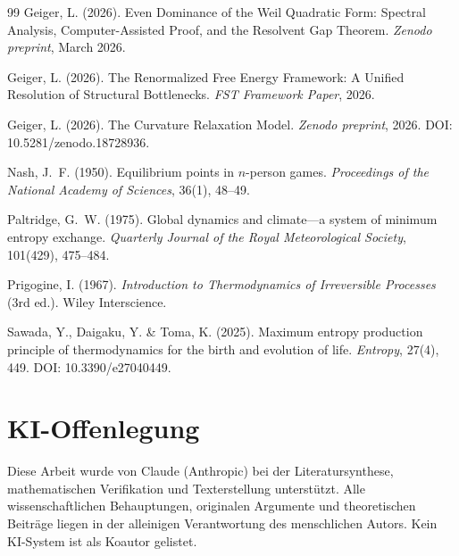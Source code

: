 \documentclass[12pt,a4paper]{article}
\theoremstyle{remark}
\begin{document}
\begin{thebibliography}{99}
Geiger, L. (2026).
\newblock Even Dominance of the Weil Quadratic Form: Spectral Analysis, Computer-Assisted Proof, and the Resolvent Gap Theorem.
\newblock \textit{Zenodo preprint}, March 2026.

Geiger, L. (2026).
\newblock The Renormalized Free Energy Framework: A Unified Resolution of Structural Bottlenecks.
\newblock \textit{FST Framework Paper}, 2026.

Geiger, L. (2026).
\newblock The Curvature Relaxation Model.
\newblock \textit{Zenodo preprint}, 2026.
\newblock DOI: 10.5281/zenodo.18728936.

Nash, J.~F. (1950).
\newblock Equilibrium points in $n$-person games.
\newblock \textit{Proceedings of the National Academy of Sciences}, 36(1), 48--49.

Paltridge, G.~W. (1975).
\newblock Global dynamics and climate---a system of minimum entropy exchange.
\newblock \textit{Quarterly Journal of the Royal Meteorological Society}, 101(429), 475--484.

Prigogine, I. (1967).
\newblock \textit{Introduction to Thermodynamics of Irreversible Processes} (3rd ed.).
\newblock Wiley Interscience.

Sawada, Y., Daigaku, Y. \& Toma, K. (2025).
\newblock Maximum entropy production principle of thermodynamics for the birth and evolution of life.
\newblock \textit{Entropy}, 27(4), 449.
\newblock DOI: 10.3390/e27040449.

\end{thebibliography}

\section*{KI-Offenlegung}
Diese Arbeit wurde von Claude (Anthropic) bei der Literatursynthese, mathematischen Verifikation und Texterstellung unterst\"utzt. Alle wissenschaftlichen Behauptungen, originalen Argumente und theoretischen Beitr\"age liegen in der alleinigen Verantwortung des menschlichen Autors. Kein KI-System ist als Koautor gelistet.
\end{document}
